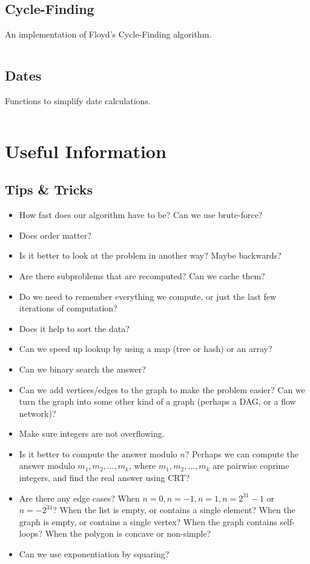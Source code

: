 \documentclass[9pt,a4paper,twocolumn,landscape,oneside]{amsart}
\newcommand{\code}[1]{\inputminted{cpp}{_code/#1}}
\begin{document}
    \subsection{Cycle-Finding}
        An implementation of Floyd's Cycle-Finding algorithm.
        \code{other/floyds_algorithm.cpp}

    \subsection{Dates}
        Functions to simplify date calculations.
        \code{other/dates.cpp}


\section{Useful Information}
    \subsection{Tips \&{} Tricks}
        \begin{itemize}
            \item How fast does our algorithm have to be? Can we use
                brute-force?
            \item Does order matter?
            \item Is it better to look at the problem in another way? Maybe
                backwards?
            \item Are there subproblems that are recomputed? Can we cache them?
            \item Do we need to remember everything we compute, or just the
                last few iterations of computation?
            \item Does it help to sort the data?
            \item Can we speed up lookup by using a map (tree or hash) or an
                array?
            \item Can we binary search the answer?
            \item Can we add vertices/edges to the graph to make the problem
                easier? Can we turn the graph into some other kind of a graph
                (perhaps a DAG, or a flow network)?
            \item Make sure integers are not overflowing.
            \item Is it better to compute the answer modulo $n$? Perhaps we can
                compute the answer modulo $m_1,m_2,\ldots,m_k$, where
                $m_1,m_2,\ldots,m_k$ are pairwise coprime integers, and find
                the real answer using CRT?
            \item Are there any edge cases? When $n=0, n=-1, n=1, n=2^{31}-1$
                or $n=-2^{31}$? When the list is empty, or contains a single
                element? When the graph is empty, or contains a single vertex?
                When the graph contains self-loops?  When the polygon is
                concave or non-simple?
            \item Can we use exponentiation by squaring?
        \end{itemize}
\end{document}
